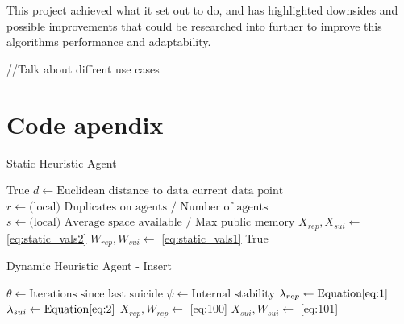 \documentclass{UoYCSproject}
\begin{document}
This project achieved what it set out to do, and has highlighted downsides and possible improvements that could be researched into further to improve this algorithms performance and adaptability.

//Talk about diffrent use cases



\appendix
\chapter{Code apendix}

\begin{algorithm}
\caption{Static Heuristic Agent}
\label{Agent_Control_Loop2}
\begin{algorithmic}[1]
\State {}
\State
{}
\State {}
\State \Return True
\EndIf
\State
\State $d \gets \text{Euclidean distance to data current data point}$
\State $r \gets \text{(local) Duplicates on agents / Number of agents}$
\State $s \gets \text{(local) Average space available / Max public memory}$
\State $X_{rep}, X_{sui} \gets $ \ref{eq:static_vals2}
\State $W_{rep}, W_{sui} \gets $ \ref{eq:static_vals1}
\State
{}
\State {}
\EndIf
\State
{}
\State {}
\EndIf
\State
\State {}
\State
\State \Return True
\EndProcedure
\end{algorithmic}
\end{algorithm}

\begin{algorithm}
\caption{Dynamic Heuristic Agent - Insert}
\label{Agent_Control_Loop3}
\begin{algorithmic}[1]
\State $\theta \gets \text{Iterations since last suicide}$
\State $\psi \gets \text{Internal stability}$
\State $\lambda_{rep} \gets \text{Equation} \ref{eq:1}$
\State $\lambda_{sui}  \gets \text{Equation} \ref{eq:2}$
\State $X_{rep}, W_{rep} \gets $ \ref{eq:100}
\State $X_{sui}, W_{sui} \gets $ \ref{eq:101}
\end{algorithmic}
\end{algorithm}
\end{document}

